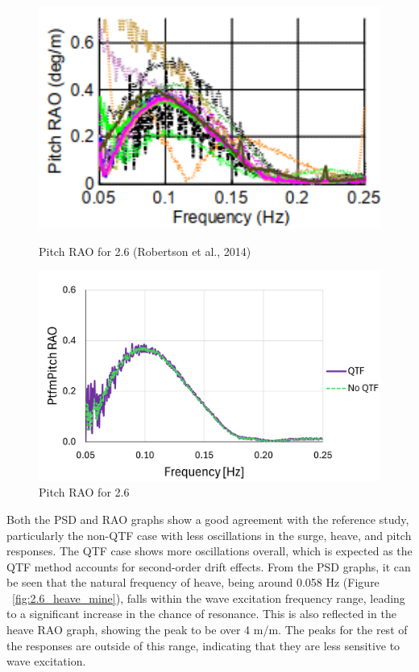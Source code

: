 \documentclass[a4paper, 11pt]{article}
\begin{document}
\begin{figure}[H]
    \begin{minipage}{0.48\textwidth}
        \centering
        \includegraphics[width=1\textwidth]{2.6_pitch.png}
        \caption{\small Pitch RAO for 2.6 (Robertson et al., 2014)}
        \label{fig:2.6_pitch}
    \end{minipage}
    \hfill
    \begin{minipage}{0.5\textwidth}
        \centering
        \includegraphics[width=1\textwidth]{2.6_pitch_mine.png}
        \caption{\small Pitch RAO for 2.6}
        \label{fig:2.6_pitch_mine}
    \end{minipage}
\end{figure}

Both the PSD and RAO graphs show a good agreement with the reference study, particularly the non-QTF case with less oscillations in the surge, heave, and pitch responses. The QTF case shows more oscillations overall, which is expected as the QTF method accounts for second-order drift effects. From the PSD graphs, it can be seen that the natural frequency of heave, being around 0.058 Hz (Figure ~\ref{fig:2.6_heave_mine}), falls within the wave excitation frequency range, leading to a significant increase in the chance of resonance. This is also reflected in the heave RAO graph, showing the peak to be over 4 m/m. The peaks for the rest of the responses are outside of this range, indicating that they are less sensitive to wave excitation. 
\end{document}
